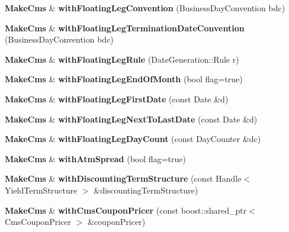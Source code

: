 \begin{DoxyCompactItemize}
\item 
{\bf Make\+Cms} \& {\bfseries with\+Floating\+Leg\+Convention} (Business\+Day\+Convention bdc)\label{class_quant_lib_1_1_make_cms_a717bf0f3edbb7ab8e69cfc9c06259e20}

\item 
{\bf Make\+Cms} \& {\bfseries with\+Floating\+Leg\+Termination\+Date\+Convention} (Business\+Day\+Convention bdc)\label{class_quant_lib_1_1_make_cms_afbbd1f0451ac09cb33e68a55da4acd91}

\item 
{\bf Make\+Cms} \& {\bfseries with\+Floating\+Leg\+Rule} (Date\+Generation\+::\+Rule r)\label{class_quant_lib_1_1_make_cms_a0024d18ed967c7f2fb4d8db57a1cd4e0}

\item 
{\bf Make\+Cms} \& {\bfseries with\+Floating\+Leg\+End\+Of\+Month} (bool flag=true)\label{class_quant_lib_1_1_make_cms_ac067447daa5602a657513d771b25bf33}

\item 
{\bf Make\+Cms} \& {\bfseries with\+Floating\+Leg\+First\+Date} (const Date \&d)\label{class_quant_lib_1_1_make_cms_af353ede99a7f66963db9025614a2dddc}

\item 
{\bf Make\+Cms} \& {\bfseries with\+Floating\+Leg\+Next\+To\+Last\+Date} (const Date \&d)\label{class_quant_lib_1_1_make_cms_a124a2bb92a0c0e7d154fa3e05228551d}

\item 
{\bf Make\+Cms} \& {\bfseries with\+Floating\+Leg\+Day\+Count} (const Day\+Counter \&dc)\label{class_quant_lib_1_1_make_cms_aab53303765aace36a6ff5718b45e60eb}

\item 
{\bf Make\+Cms} \& {\bfseries with\+Atm\+Spread} (bool flag=true)\label{class_quant_lib_1_1_make_cms_a9bc4e1dba2f171682d67e95b3a59628c}

\item 
{\bf Make\+Cms} \& {\bfseries with\+Discounting\+Term\+Structure} (const Handle$<$ Yield\+Term\+Structure $>$ \&discounting\+Term\+Structure)\label{class_quant_lib_1_1_make_cms_adaa05ee7db26477af48db709843a6bf1}

\item 
{\bf Make\+Cms} \& {\bfseries with\+Cms\+Coupon\+Pricer} (const boost\+::shared\+\_\+ptr$<$ Cms\+Coupon\+Pricer $>$ \&coupon\+Pricer)\label{class_quant_lib_1_1_make_cms_aba9bbcb7d4a2dd3f3e4011ec66795565}

\end{DoxyCompactItemize}


